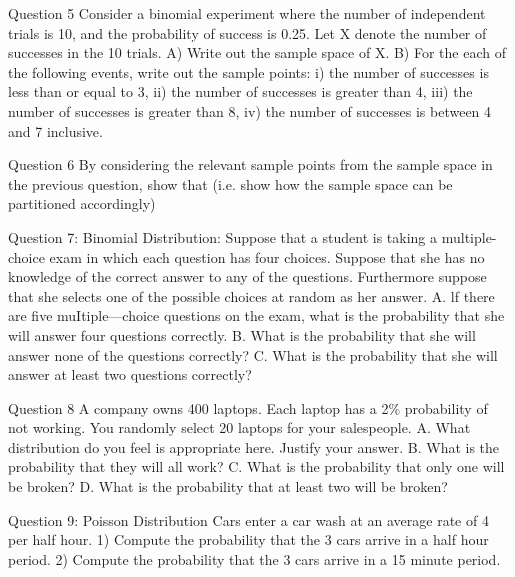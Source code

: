 \documentclass[IntroMain.tex]{subfiles}
\begin{document}
\begin{frame}

Question 5
Consider a binomial experiment where the number of independent trials is 10, and the probability of success is 0.25. Let X denote the number of successes in the 10 trials.
A)	Write out the sample space of X.
B)	For the each of the following events, write out the sample points:
i)	the number of successes is less than or equal to 3,
ii)	the number of successes is greater than 4, 
iii)	the number of successes is greater than 8, 
iv)	the number of successes is between 4 and 7 inclusive.

\end{frame}
\begin{frame}
Question 6
By considering the relevant sample points from the sample space in the previous question, show that 
(i.e. show how the sample space can be partitioned accordingly)


\end{frame}
\begin{frame}

Question 7: Binomial Distribution: 
Suppose that a student is taking a multiple-choice exam in which each question has four choices.
Suppose that she has no knowledge of the correct answer to any of the questions. Furthermore suppose that she selects one of the possible choices at random as her answer.
A.	lf there are five muItiple—choice questions on the exam, what is the probability that she will answer four questions correctly.
B.	What is the probability that she will answer none of the questions correctly?
C.	What is the probability that she will answer at least two questions correctly?


\end{frame}
\begin{frame}

Question 8
A company owns 400 laptops. Each laptop has a 2\% probability of not working. You randomly select 20 laptops for your salespeople.
A. What distribution do you feel is appropriate here. Justify your answer. 
B. What is the probability that they will all work?
C. What is the probability that only one will be broken?
D. What is the probability that at least two will be broken? 

\end{frame}
\begin{frame}

Question 9:  Poisson Distribution
Cars enter a car wash at an average rate of 4 per half hour. 
1)	Compute the probability that the 3 cars arrive in a half hour period.
2)	Compute the probability that the 3 cars arrive in a 15 minute period.
\end{frame}
\end{document}
